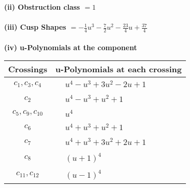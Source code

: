 \documentclass[1p]{elsarticle_modified}
\theoremstyle{definition}
\begin{document}
\flushleft \textbf{(ii) Obstruction class $= 1$}\\~\\
\flushleft \textbf{(iii) Cusp Shapes $= -\frac{1}{4} u^3-\frac{7}{2} u^2-\frac{23}{4} u+\frac{37}{4}$}\\~\\
\newpage\renewcommand{\arraystretch}{1}
\flushleft \textbf{(iv) u-Polynomials at the component}\newline \\
\begin{tabular}{m{50pt}|m{274pt}}
Crossings & \hspace{64pt}u-Polynomials at each crossing \\
\hline $$\begin{aligned}c_{1},c_{3},c_{4}\end{aligned}$$&$\begin{aligned}
&u^4- u^3+3 u^2-2 u+1
\end{aligned}$\\
\hline $$\begin{aligned}c_{2}\end{aligned}$$&$\begin{aligned}
&u^4- u^3+u^2+1
\end{aligned}$\\
\hline $$\begin{aligned}c_{5},c_{9},c_{10}\end{aligned}$$&$\begin{aligned}
&u^4
\end{aligned}$\\
\hline $$\begin{aligned}c_{6}\end{aligned}$$&$\begin{aligned}
&u^4+u^3+u^2+1
\end{aligned}$\\
\hline $$\begin{aligned}c_{7}\end{aligned}$$&$\begin{aligned}
&u^4+u^3+3 u^2+2 u+1
\end{aligned}$\\
\hline $$\begin{aligned}c_{8}\end{aligned}$$&$\begin{aligned}
&(u+1)^4
\end{aligned}$\\
\hline $$\begin{aligned}c_{11},c_{12}\end{aligned}$$&$\begin{aligned}
&(u-1)^4
\end{aligned}$\\
\hline
\end{tabular}\\~\\
\end{document}
